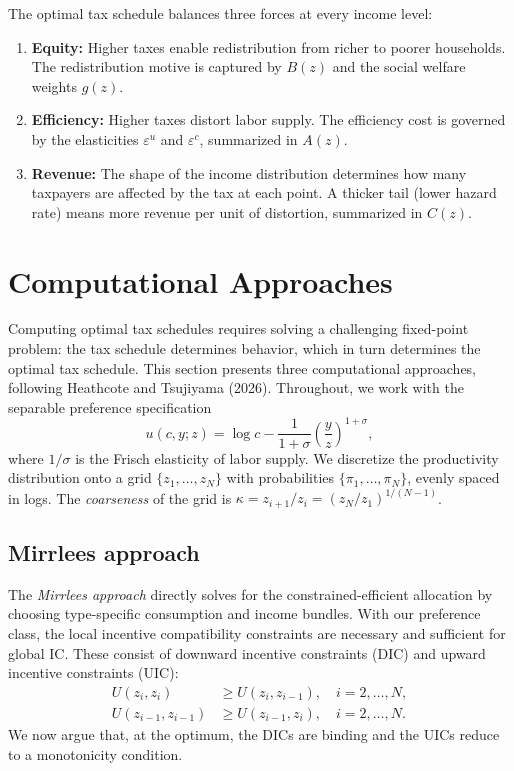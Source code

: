 \documentclass[12pt,a4paper]{article}
\theoremstyle{definition}
\theoremstyle{plain}
\theoremstyle{remark}
\begin{document}
The optimal tax schedule balances three forces at every income level:
\begin{enumerate}[label=\arabic*., leftmargin=2em]
  \item \textbf{Equity:} Higher taxes enable redistribution from richer to poorer households. The redistribution motive is captured by $B(z)$ and the social welfare weights $g(z)$.

  \item \textbf{Efficiency:} Higher taxes distort labor supply. The efficiency cost is governed by the elasticities $\varepsilon^u$ and $\varepsilon^c$, summarized in $A(z)$.

  \item \textbf{Revenue:} The shape of the income distribution determines how many taxpayers are affected by the tax at each point. A thicker tail (lower hazard rate) means more revenue per unit of distortion, summarized in $C(z)$.
\end{enumerate}

\section{Computational Approaches}
\label{sec:computation}

Computing optimal tax schedules requires solving a challenging fixed-point problem: the tax schedule determines behavior, which in turn determines the optimal tax schedule. This section presents three computational approaches, following Heathcote and Tsujiyama (2026). Throughout, we work with the separable preference specification
\[
  u(c,y;z) = \log c - \frac{1}{1+\sigma}\left(\frac{y}{z}\right)^{1+\sigma},
\]
where $1/\sigma$ is the Frisch elasticity of labor supply. We discretize the productivity distribution onto a grid $\{z_1, \ldots, z_N\}$ with probabilities $\{\pi_1, \ldots, \pi_N\}$, evenly spaced in logs. The \emph{coarseness} of the grid is $\kappa = z_{i+1}/z_i = (z_N/z_1)^{1/(N-1)}$.

\subsection{Mirrlees approach}
\label{sec:mirrlees_approach}

The \emph{Mirrlees approach} directly solves for the constrained-efficient allocation by choosing type-specific consumption and income bundles. With our preference class, the local incentive compatibility constraints are necessary and sufficient for global IC. These consist of downward incentive constraints (DIC) and upward incentive constraints (UIC):
\begin{align}
  U(z_i, z_i) &\geq U(z_i, z_{i-1}), \quad i = 2, \ldots, N, \tag{DIC} \label{eq:DIC} \\
  U(z_{i-1}, z_{i-1}) &\geq U(z_{i-1}, z_i), \quad i = 2, \ldots, N. \tag{UIC} \label{eq:UIC}
\end{align}
We now argue that, at the optimum, the DICs are binding and the UICs reduce to a monotonicity condition.
\end{document}
